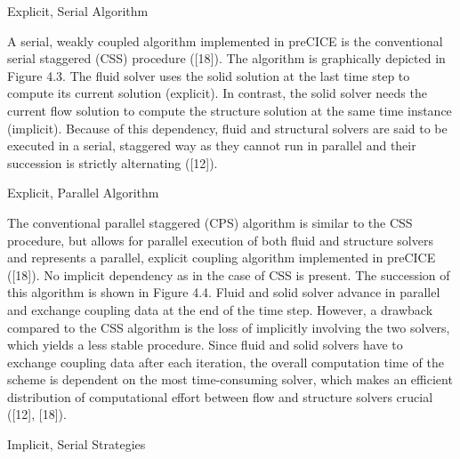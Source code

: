 Explicit, Serial Algorithm

A serial, weakly coupled algorithm implemented in preCICE is the conventional serial staggered (CSS)
procedure ([18]). The algorithm is graphically depicted in Figure 4.3. The fluid solver uses the solid
solution at the last time step to compute its current solution (explicit). In contrast, the solid solver needs
the current flow solution to compute the structure solution at the same time instance (implicit). Because
of this dependency, fluid and structural solvers are said to be executed in a serial, staggered way as they
cannot run in parallel and their succession is strictly alternating ([12]).

Explicit, Parallel Algorithm

The conventional parallel staggered (CPS) algorithm is similar to the CSS procedure, but allows for
parallel execution of both fluid and structure solvers and represents a parallel, explicit coupling algorithm
implemented in preCICE ([18]). No implicit dependency as in the case of CSS is present. The succession
of this algorithm is shown in Figure 4.4. Fluid and solid solver advance in parallel and exchange coupling
data at the end of the time step. However, a drawback compared to the CSS algorithm is the loss of
implicitly involving the two solvers, which yields a less stable procedure. Since fluid and solid solvers have
to exchange coupling data after each iteration, the overall computation time of the scheme is dependent
on the most time-consuming solver, which makes an efficient distribution of computational effort between
flow and structure solvers crucial ([12], [18]).

Implicit, Serial Strategies

